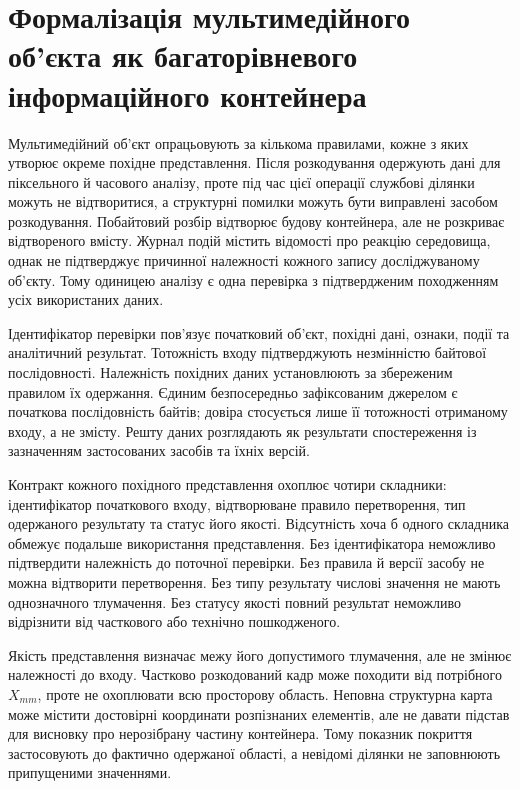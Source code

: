 \section{Формалізація мультимедійного об’єкта як багаторівневого інформаційного контейнера}
\label{sec:multilevel_container}

Мультимедійний об’єкт опрацьовують за кількома правилами, кожне з яких утворює окреме похідне представлення. Після розкодування одержують дані для піксельного й часового аналізу, проте під час цієї операції службові ділянки можуть не відтворитися, а структурні помилки можуть бути виправлені засобом розкодування. Побайтовий розбір відтворює будову контейнера, але не розкриває відтвореного вмісту. Журнал подій містить відомості про реакцію середовища, однак не підтверджує причинної належності кожного запису досліджуваному об’єкту. Тому одиницею аналізу є одна перевірка з підтвердженим походженням усіх використаних даних.

Ідентифікатор перевірки пов’язує початковий об’єкт, похідні дані, ознаки, події та аналітичний результат. Тотожність входу підтверджують незмінністю байтової послідовності. Належність похідних даних установлюють за збереженим правилом їх одержання. Єдиним безпосередньо зафіксованим джерелом є початкова послідовність байтів; довіра стосується лише її тотожності отриманому входу, а не змісту. Решту даних розглядають як результати спостереження із зазначенням застосованих засобів та їхніх версій.

Контракт кожного похідного представлення охоплює чотири складники: ідентифікатор початкового входу, відтворюване правило перетворення, тип одержаного результату та статус його якості. Відсутність хоча б одного складника обмежує подальше використання представлення. Без ідентифікатора неможливо підтвердити належність до поточної перевірки. Без правила й версії засобу не можна відтворити перетворення. Без типу результату числові значення не мають однозначного тлумачення. Без статусу якості повний результат неможливо відрізнити від часткового або технічно пошкодженого.

Якість представлення визначає межу його допустимого тлумачення, але не змінює належності до входу. Частково розкодований кадр може походити від потрібного $X_{mm}$, проте не охоплювати всю просторову область. Неповна структурна карта може містити достовірні координати розпізнаних елементів, але не давати підстав для висновку про нерозібрану частину контейнера. Тому показник покриття застосовують до фактично одержаної області, а невідомі ділянки не заповнюють припущеними значеннями.

